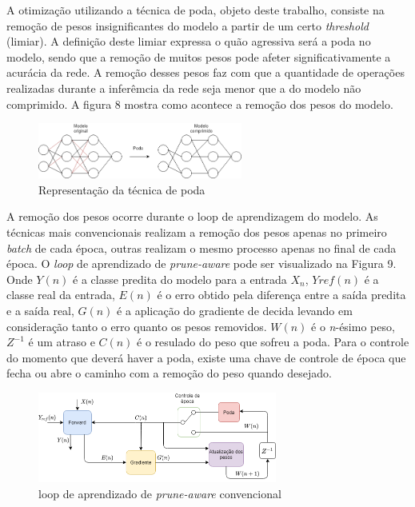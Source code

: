 A otimização utilizando a técnica de poda, objeto deste trabalho, consiste na remoção de pesos insignificantes do modelo a partir de um certo \textit{threshold} (limiar). A definição deste limiar expressa o quão agressiva será a poda no modelo, sendo que a remoção de muitos pesos pode afeter significativamente a acurácia da rede. A remoção desses pesos faz com que a quantidade de operações realizadas durante a inferêmcia da rede seja menor que a do modelo não comprimido. A figura 8 mostra como acontece a remoção dos pesos do modelo.

\begin{figure}[H]
	\includegraphics[width=0.6\textwidth, keepaspectratio=true]{figuras/poda.png}
	\centering
	\caption[Representação da técnica de poda]{Representação da técnica de poda}
\end{figure}

A remoção dos pesos ocorre durante o loop de aprendizagem do modelo. As técnicas mais convencionais realizam a remoção dos pesos apenas no primeiro \textit{batch} de cada época, outras realizam o mesmo processo apenas no final de cada época. O \textit{loop} de aprendizado de \textit{prune-aware} pode ser visualizado na Figura 9. Onde $Y(n)$ é a classe predita do modelo para a entrada $X_n$, $Yref(n)$ é a classe real da entrada, $E(n)$ é o erro obtido pela diferença entre a saída predita e a saída real, $G(n)$ é a aplicação do gradiente de decida levando em consideração tanto o erro quanto os pesos removidos. $W(n)$ é o \textit{n}-ésimo peso, $Z^{-1}$ é um atraso e $C(n)$ é o resulado do peso que sofreu a poda. Para o controle do momento que deverá haver a poda, existe uma chave de controle de época que fecha ou abre o caminho com a remoção do peso quando desejado.


\begin{figure}[!h]
	\includegraphics[width=0.7\textwidth, keepaspectratio=true]{figuras/prune_normal (1).png}
	\centering
	\caption[loop de aprendizado de \textit{prune-aware} convencional]{loop de aprendizado de \textit{prune-aware} convencional}
\end{figure}


